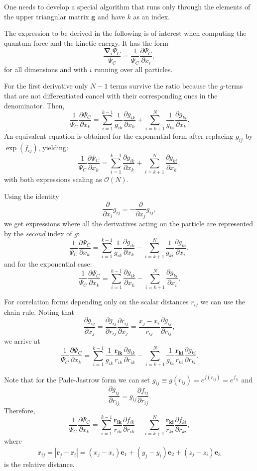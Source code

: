 One needs to develop a special algorithm 
that runs only through the elements of the upper triangular
matrix $\mathbf{g}$ and have $k$ as an index. 

The expression to be derived in the following is of interest when computing the quantum force and the kinetic energy. It has the form
\[
\frac{\mathbf{\nabla}_i\Psi_C}{\Psi_C} = \frac{1}{\Psi_C}\frac{\partial \Psi_C}{\partial x_i},
\]
for all dimensions and with $i$ running over all particles.

For the first derivative only $N-1$ terms survive the ratio because the $g$-terms that are not differentiated cancel with their corresponding ones in the denominator. Then,
\[
\frac{1}{\Psi_C}\frac{\partial \Psi_C}{\partial x_k} =
\sum_{i=1}^{k-1}\frac{1}{g_{ik}}\frac{\partial g_{ik}}{\partial x_k}
+
\sum_{i=k+1}^{N}\frac{1}{g_{ki}}\frac{\partial g_{ki}}{\partial x_k}.
\]
An equivalent equation is obtained for the exponential form after replacing $g_{ij}$ by $\exp(f_{ij})$, yielding:
\[
\frac{1}{\Psi_C}\frac{\partial \Psi_C}{\partial x_k} =
\sum_{i=1}^{k-1}\frac{\partial g_{ik}}{\partial x_k}
+
\sum_{i=k+1}^{N}\frac{\partial g_{ki}}{\partial x_k},
\]
with both expressions scaling as $\mathcal{O}(N)$.

Using the identity 
\[
\frac{\partial}{\partial x_i}g_{ij} = -\frac{\partial}{\partial x_j}g_{ij},
\]
we get expressions where all the derivatives acting on the particle  are represented by the \emph{second} index of $g$:
\[
\frac{1}{\Psi_C}\frac{\partial \Psi_C}{\partial x_k} =
\sum_{i=1}^{k-1}\frac{1}{g_{ik}}\frac{\partial g_{ik}}{\partial x_k}
-\sum_{i=k+1}^{N}\frac{1}{g_{ki}}\frac{\partial g_{ki}}{\partial x_i},
\]
and for the exponential case:
\[
\frac{1}{\Psi_C}\frac{\partial \Psi_C}{\partial x_k} =
\sum_{i=1}^{k-1}\frac{\partial g_{ik}}{\partial x_k}
-\sum_{i=k+1}^{N}\frac{\partial g_{ki}}{\partial x_i}.
\]

For correlation forms depending only on the scalar distances $r_{ij}$ we can use the chain rule. Noting that 
\[
\frac{\partial g_{ij}}{\partial x_j} = \frac{\partial g_{ij}}{\partial r_{ij}} \frac{\partial r_{ij}}{\partial x_j} = \frac{x_j - x_i}{r_{ij}} \frac{\partial g_{ij}}{\partial r_{ij}},
\]
we arrive at
\[
\frac{1}{\Psi_C}\frac{\partial \Psi_C}{\partial x_k} = 
\sum_{i=1}^{k-1}\frac{1}{g_{ik}} \frac{\mathbf{r_{ik}}}{r_{ik}} \frac{\partial g_{ik}}{\partial r_{ik}}
-\sum_{i=k+1}^{N}\frac{1}{g_{ki}}\frac{\mathbf{r_{ki}}}{r_{ki}}\frac{\partial g_{ki}}{\partial r_{ki}}.
\]

Note that for the Pade-Jastrow form we can set $g_{ij} \equiv g(r_{ij}) = e^{f(r_{ij})} = e^{f_{ij}}$ and 
\[
\frac{\partial g_{ij}}{\partial r_{ij}} = g_{ij} \frac{\partial f_{ij}}{\partial r_{ij}}.
\]
Therefore, 
\[
\frac{1}{\Psi_{C}}\frac{\partial \Psi_{C}}{\partial x_k} =
\sum_{i=1}^{k-1}\frac{\mathbf{r_{ik}}}{r_{ik}}\frac{\partial f_{ik}}{\partial r_{ik}}
-\sum_{i=k+1}^{N}\frac{\mathbf{r_{ki}}}{r_{ki}}\frac{\partial f_{ki}}{\partial r_{ki}},
\]
where 
\[
 \mathbf{r}_{ij} = |\mathbf{r}_j - \mathbf{r}_i| = (x_j - x_i)\mathbf{e}_1 + (y_j - y_i)\mathbf{e}_2 + (z_j - z_i)\mathbf{e}_3
\]
is the relative distance. 

